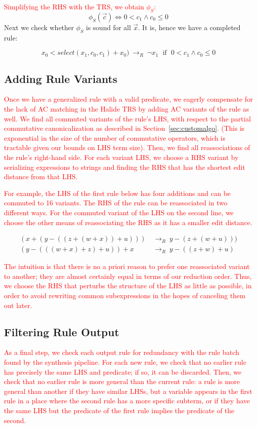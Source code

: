 \documentclass[acmsmall,review]{acmart}\settopmatter{printfolios=true,printccs=false,printacmref=false}
\newcommand{\modified}[1]{\textcolor{red}{{#1}}}
\newcommand{\rewrites}[0]{\:\rightarrow_{R}\:}
\newcommand{\pred}[0]{\textrm{ if }}
\begin{document}
\modified{Simplifying the RHS with the TRS, we obtain $\phi_S$: }
%
\[  \phi_S(\vec{c}) \iff 0 < c_1 \wedge c_0 \le 0
\]
Next we check whether $\phi_S$ is sound for all $\vec{x}$.  It is, hence we have a completed rule:

\[ x_0 < select(x_1, c_0, c_1) + x_0) \rewrites \neg x_1 \;\pred \;0 < c_1 \wedge c_0 \le 0
\]


\subsection{Adding Rule Variants}
\label{sec:rulevariants}
\modified{Once we have a generalized rule with a valid predicate, we eagerly compensate for the lack
of AC matching in the Halide TRS by adding AC variants of the rule as well. We find 
all commuted variants of the rule's LHS,
with respect to the partial commutative canonicalization as described in Section~\ref{sec:customalgo}.
 (This is exponential in the size of the number 
of commutative operators, which is tractable given our bounds on LHS term size). 
Then, we find all reassociations of the rule's right-hand side. For each variant LHS, 
we choose a RHS variant by serializing expressions to strings and finding the RHS 
that has the shortest edit distance from that LHS. }

\modified{For example, the LHS of the first rule below has four additions and can be commuted 
to 16 variants. The RHS of the rule can be reassociated in two different ways. For the 
commuted variant of the LHS on the second line, we choose the other means of reassociating
the RHS as it has a smaller edit distance.}

\begin{equation*}
\begin{split}
(x + (y - ((z + (w + x)) + u))) & \rewrites y - (z + (w + u))) \\
(y - (((w + x) + z) + u)) + x & \rewrites y - ((z + w) + u)
\end{split}
\end{equation*}

\modified{The intuition is that there is no a priori reason 
to prefer one reassociated variant to another; they are almost certainly equal in 
terms of our reduction order. Thus, we choose the RHS that perturbs the structure of the 
LHS as little as possible, in order to avoid rewriting common subexpressions in the hopes
of canceling them out later.}


\subsection{Filtering Rule Output}
\label{sec:filtering}
\modified{As a final step, we check each output rule for redundancy with the rule batch found
by the synthesis pipeline. For each new rule, we check
that no earlier rule has precisely the same LHS and predicate; if so, it can be discarded.
Then, we check that no earlier rule is more general than the current rule: a rule is more 
general than another if they have similar LHSs, but a variable appears in the first rule 
in a place where the second rule has a more specific subterm, or if they have the same LHS
but the predicate of the first rule implies the predicate of the second.}
\end{document}
